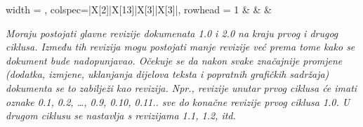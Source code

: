 \begin{longtblr}[
				label=none
			]{
				width = \textwidth, 
				colspec={|X[2]|X[13]|X[3]|X[3]|}, 
				rowhead = 1
			}
			&  &  & \\[3pt] \hline	
		\end{longtblr}
	
	
		\textit{Moraju postojati glavne revizije dokumenata 1.0 i 2.0 na kraju prvog i drugog ciklusa. Između tih revizija mogu postojati manje revizije već prema tome kako se dokument bude nadopunjavao. Očekuje se da nakon svake značajnije promjene (dodatka, izmjene, uklanjanja dijelova teksta i popratnih grafičkih sadržaja) dokumenta se to zabilježi kao revizija. Npr., revizije unutar prvog ciklusa će imati oznake 0.1, 0.2, …, 0.9, 0.10, 0.11.. sve do konačne revizije prvog ciklusa 1.0. U drugom ciklusu se nastavlja s revizijama 1.1, 1.2, itd.}